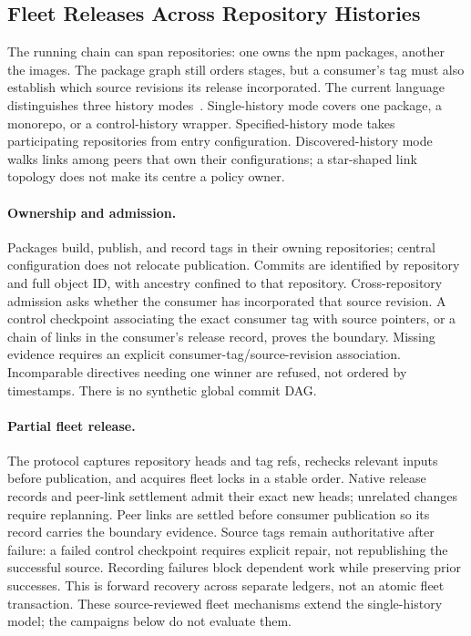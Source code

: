 \subsection{Fleet Releases Across Repository Histories}
\label{sec:fleet}
The running chain can span repositories: one owns the npm packages, another
the images. The package graph still orders stages, but a consumer's tag must
also establish which source revisions its release incorporated. The current
language distinguishes three history modes~\cite{ccme2}. Single-history mode
covers one package, a monorepo, or a control-history wrapper. Specified-history
mode takes participating repositories from entry configuration. Discovered-history
mode walks links among peers that own their configurations; a star-shaped
link topology does not make its centre a policy owner.

\paragraph{Ownership and admission.}
Packages build, publish, and record tags in their owning repositories;
central configuration does not relocate publication. Commits are identified by
repository and full object ID, with ancestry confined to that repository.
Cross-repository admission asks whether the consumer has incorporated that
source revision. A control checkpoint associating the exact consumer tag with
source pointers, or a chain of links in the consumer's release record, proves
the boundary. Missing evidence requires an explicit consumer-tag/source-revision
association. Incomparable directives needing one winner are refused, not
ordered by timestamps. There is no synthetic global commit DAG.

\paragraph{Partial fleet release.}
The protocol captures repository heads and tag refs, rechecks relevant inputs
before publication, and acquires fleet locks in a stable order. Native release
records and peer-link settlement admit their exact new heads; unrelated changes
require replanning. Peer links are settled before consumer publication so its
record carries the boundary evidence. Source tags remain authoritative after
failure: a failed control checkpoint requires explicit repair, not republishing
the successful source. Recording failures block dependent work while preserving
prior successes. This is forward recovery across separate ledgers, not an
atomic fleet transaction. These source-reviewed fleet mechanisms extend the
single-history model; the campaigns below do not evaluate them.

